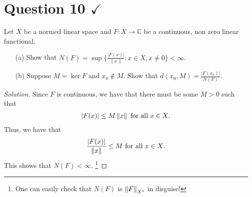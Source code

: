\section{Question 10 \texorpdfstring{$\checkmark$}{}}
\horz
Let $X$ be a normed linear space and $F: X \to \mathbb C$ be a continuous, non zero linear functional. 
\begin{itemize}
\item[(a)] Show that $ N(F)=\sup\Big\{ \frac{|F(x)|}{\|x\|} : x \in X, x \neq 0\Big\} < \infty.$
\item[(b)] Suppose $M = \ker F$ and $x_0 \notin M.$ Show that $d(x_0, M) = \frac{|F(x_0)|}{N(F)}.$
\end{itemize}
\horz

\begin{proof}[Solution]
    Since $F$ is continuous, we have that there must be some $M > 0$ such that 
    \begin{align*}
	\left\lvert F(x) \right\rvert \le M \left\lVert x \right\rVert \text{ for all } x \in X\text{.} 
    \end{align*}
    Thus, we have that 
    \begin{align*}
	\frac{\left\lvert F(x) \right\rvert}{\left\lVert x \right\rVert} \le M \text{ for all } x \in X\text{.} 
    \end{align*}
    This shows that $N\left( F \right) < \infty$. \footnote{One can easily check that $N(F)$ is $\left\lVert F \right\rVert_{X^*}$ in disguise!}


\end{proof}
